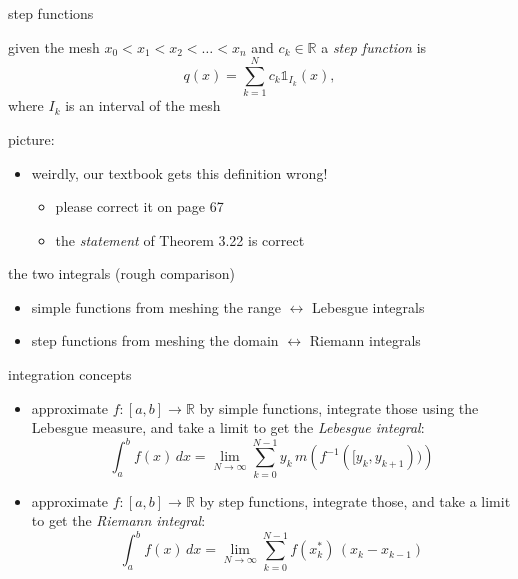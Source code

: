\documentclass[10pt,
               svgnames,
               hyperref={colorlinks,
                         citecolor=DeepPink4,
                         linkcolor=FireBrick,
                         urlcolor=blue},
               usepdftitle=false]{beamer}
\newcommand{\RR}{\mathbb{R}}
\newcommand{\one}{\mathds{1}}
\begin{document}
\begin{frame}{step functions}

\begin{definition}
given the mesh $x_0<x_1<x_2<\dots<x_n$ and $c_k \in \RR$ a \emph{step function} is
     $$q(x) = \sum_{k=1}^N c_k \one_{I_k}(x),$$
where $I_k$ is an interval of the mesh
\end{definition}

\medskip \noindent picture:

\vspace{20mm}

\begin{itemize}
\item weirdly, our textbook gets this definition \alert{wrong}!
    \begin{itemize}
    \item[$\circ$] please correct it on page 67
    \item[$\circ$] the \emph{statement} of Theorem 3.22 is correct
    \end{itemize}
\end{itemize}
\end{frame}


\begin{frame}{the two integrals (rough comparison)}

\begin{itemize}
\item simple functions \alert{from meshing the range} $\leftrightarrow$ Lebesgue integrals
\item step functions \alert{from meshing the domain} $\leftrightarrow$ Riemann integrals
\end{itemize}

\begin{block}{integration concepts}
\begin{itemize}
\item approximate $f:[a,b] \to \RR$ by \alert{simple} functions, integrate those using the Lebesgue measure, and take a limit to get the \emph{Lebesgue integral}:
    $$\int_a^b f(x)\,dx = \lim_{N\to \infty} \sum_{k=0}^{N-1} y_{k}\, m\left(f^{-1}([y_{k},y_{k+1}))\right)$$
\item approximate $f:[a,b] \to \RR$ by \alert{step} functions, integrate those, and take a limit to get the \emph{Riemann integral}:
    $$\int_a^b f(x)\,dx = \lim_{N\to \infty} \sum_{k=0}^{N-1} f(x_k^*)\, (x_k-x_{k-1})$$
\end{itemize}
\end{block}
\end{frame}
\end{document}
